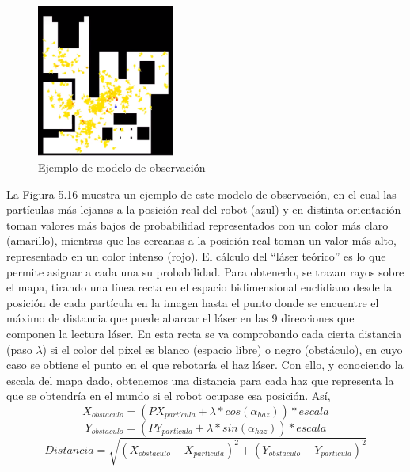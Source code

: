 \begin{figure}[H]
\begin{center}
	\includegraphics[width=0.4\textwidth]{figures/modeloobsv.png}
	\caption{Ejemplo de modelo de observación}
	\label{fig.modeloobsv}
	\end{center}
\end{figure}
La Figura 5.16 muestra un ejemplo de este modelo de observación, en el cual las partículas más lejanas a la posición real del robot (azul) y en distinta orientación toman valores más bajos de probabilidad representados con un color más claro (amarillo), mientras que las cercanas a la posición real toman un valor más alto, representado en un color intenso (rojo). El cálculo del “láser teórico” es lo que permite asignar a cada una su probabilidad. Para obtenerlo, se trazan rayos sobre el mapa, tirando una línea recta en el espacio bidimensional euclidiano desde la posición de cada partícula en la imagen hasta el punto donde se encuentre el máximo de distancia que puede abarcar el láser en las 9 direcciones que componen la lectura láser. En esta recta se va comprobando cada cierta distancia (paso $\lambda$) si el color del píxel es blanco (espacio libre) o negro (obstáculo), en cuyo caso se obtiene el punto en el que rebotaría el haz láser. Con ello, y conociendo la escala del mapa dado, obtenemos una distancia para cada haz que representa la que se obtendría en el mundo si el robot ocupase esa posición. Así, 
\begin{equation}
X_{obstaculo} = (PX_{partícula} + \lambda*cos(\alpha_{haz}))*escala
\end{equation}
\begin{equation}
Y_{obstaculo} = (PY_{partícula} + \lambda*sin(\alpha_{haz}))*escala
\end{equation}
\begin{equation}
Distancia = \sqrt{(X_{obstaculo}-X_{partícula})^2+(Y_{obstaculo}-Y_{partícula})^2}
\end{equation}

